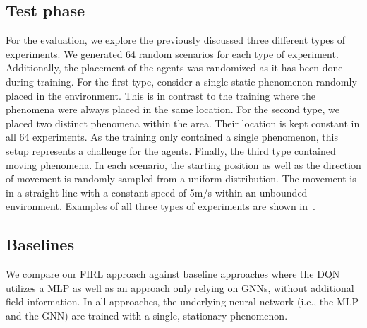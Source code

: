 \subsection{Test phase}
For the evaluation, 
 we explore the previously discussed three different types of experiments.
%
We generated 64 random scenarios for each type of experiment. 
 Additionally, the placement of the agents was randomized as it has been done during training.
For the first type, consider a single static phenomenon randomly placed in the environment. 
This is in contrast to the training where the phenomena were always placed in the same location.  
For the second type, we placed two distinct phenomena within the area. 
Their location is kept constant in all 64 experiments. 
As the training only contained a single phenomenon, 
this setup represents a challenge for the agents.
Finally, the third type contained moving phenomena. 
In each scenario, the starting position as well as the direction of movement is randomly sampled from a uniform distribution. 
The movement is in a straight line with a constant speed of 5m/s within an unbounded environment. 
%
Examples of all three types of experiments are shown in~. %


\subsection{Baselines}
We compare our \ac{FIRL} approach against baseline approaches where the \ac{DQN} utilizes a \ac{MLP} as well as an approach only relying on \acp{GNN}, without additional field information. 
%
In all approaches, the underlying neural network (i.e., the \ac{MLP} and the \ac{GNN}) are trained %
with a single, stationary phenomenon.
%

